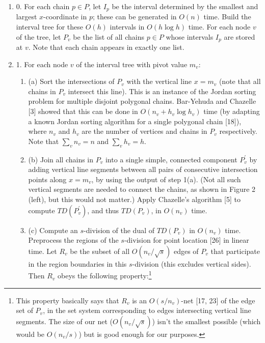 \begin{enumerate}
\item[]  0. 
For each chain $p\in P$, let $I_{p}$ be the interval determined by the smallest and largest $x$-coordinate in $p$; these can be generated in $O(n)$ time. Build the interval tree for these $O(h)$ intervals in $O(h\log h)$ time. For each node $v$ of the tree, let $P_{v}$ be the list of all chains $p\in P$ whose intervals $I_{p}$ are stored at $v$. Note that each chain appears in exactly one list.
\par
\par
\item[]  1. 
For each node $v$ of the interval tree with pivot value $m_{v}$:
\par
\begin{enumerate}
\item[]  (a) 
Sort the intersections of $P_{v}$ with the vertical line $x=m_{v}$ (note that all chains in $P_{v}$ intersect this line). This is an instance of the Jordan sorting problem for multiple disjoint polygonal chains. Bar-Yehuda and Chazelle [3] showed that this can be done in $O(n_{v}+h_{v}\log h_{v})$ time (by adapting a known Jordan sorting algorithm for a single polygonal chain [18]), where $n_{v}$ and $h_{v}$ are the number of vertices and chains in $P_{v}$ respectively. Note that $\sum_{v}n_{v}=n$ and $\sum_{v}h_{v}=h$.
\par
\par
\item[]  (b) 
Join all chains in $P_{v}$ into a single simple, connected component $P^{\prime}_{v}$ by adding vertical line segments between all pairs of consecutive intersection points along $x=m_{v}$, by using the output of step 1(a). (Not all such vertical segments are needed to connect the chains, as shown in Figure 2 (left), but this would not matter.) Apply Chazelle’s algorithm [5] to compute $\textit{TD}(P^{\prime}_{v})$, and thus $\textit{TD}(P_{v})$, in $O(n_{v})$ time.
\par
\par
\item[]  (c) 
Compute an $s$-division of the dual of $\textit{TD}(P_{v})$ in $O(n_{v})$ time. Preprocess the regions of the $s$-division for point location [26] in linear time. Let $R_{v}$ be the subset of all $O(n_{v}/\sqrt{s})$ edges of $P_{v}$ that participate in the region boundaries in this $s$-division (this excludes vertical sides). Then $R_{v}$ obeys the following property:\footnote{This property basically says that $R_{v}$ is an $O(s/n_{v})$-net [17, 23] of the edge set of $P_{v}$, in the set system corresponding to edges intersecting vertical line segments. The size of our net ($O(n_{v}/\sqrt{s})$) isn’t the smallest possible (which would be $O(n_{v}/s)$) but is good enough for our purposes. }

\end{enumerate}
\end{enumerate}
